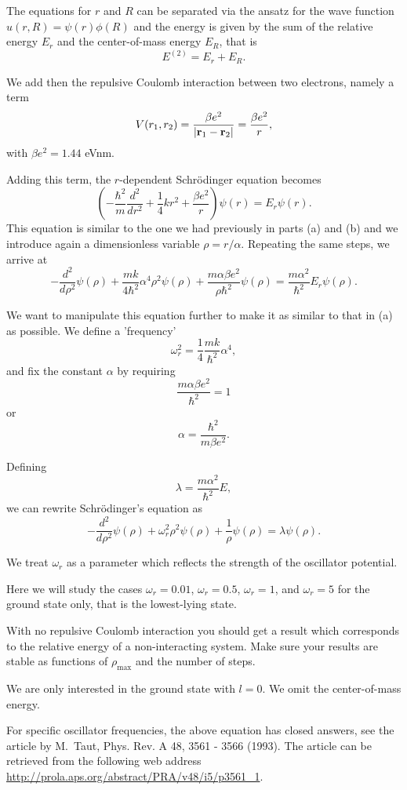 The equations for $r$ and $R$ can be separated via the ansatz for the 
wave function $u(r,R) = \psi(r)\phi(R)$ and the energy is given by the sum
of the relative energy $E_r$ and the center-of-mass energy $E_R$, that
is
\[
E^{(2)}=E_r+E_R.
\]

We add then the repulsive Coulomb interaction between two electrons,
namely a term 
\[
V(r_1,r_2) = \frac{\beta e^2}{|{\bf r}_1-{\bf r}_2|}=\frac{\beta e^2}{r},
\]
with $\beta e^2=1.44$ eVnm.


Adding this term, the $r$-dependent Schr\"odinger equation becomes
\[
\left(  -\frac{\hbar^2}{m} \frac{d^2}{dr^2}+ \frac{1}{4}k r^2+\frac{\beta e^2}{r}\right)\psi(r)  = E_r \psi(r).
\]
This equation is similar to the one we had previously in parts (a) and (b) 
and we introduce
again a dimensionless variable $\rho = r/\alpha$. Repeating the same
steps, we arrive at 
\[
  -\frac{d^2}{d\rho^2} \psi(\rho) 
       + \frac{mk}{4\hbar^2} \alpha^4\rho^2\psi(\rho)+\frac{m\alpha \beta e^2}{\rho\hbar^2}\psi(\rho)  = 
\frac{m\alpha^2}{\hbar^2}E_r \psi(\rho) .
\]



We want to manipulate this equation further to make it as similar to that in (a)
as possible. We define a 'frequency' 
\[
\omega_r^2=\frac{1}{4}\frac{mk}{\hbar^2} \alpha^4,
\]
and fix the constant $\alpha$ by requiring 
\[
\frac{m\alpha \beta e^2}{\hbar^2}=1
\]
or 
\[
\alpha = \frac{\hbar^2}{m\beta e^2}.
\]



Defining 
\[
\lambda = \frac{m\alpha^2}{\hbar^2}E,
\]
we can rewrite Schr\"odinger's equation as
\[
  -\frac{d^2}{d\rho^2} \psi(\rho) + \omega_r^2\rho^2\psi(\rho) +\frac{1}{\rho}\psi(\rho) = \lambda \psi(\rho).
\]



We treat $\omega_r$ as a parameter which reflects the strength of the oscillator potential.

Here we will study the cases $\omega_r = 0.01$, $\omega_r = 0.5$, $\omega_r =1$,
and $\omega_r = 5$   
for the ground state only, that is the lowest-lying state.


With no repulsive Coulomb interaction 
you should get a result which corresponds to 
the relative energy of a non-interacting system.   
Make sure your results are 
stable as functions of $\rho_{\mathrm{max}}$ and the number of steps.

We are only interested in the ground state with $l=0$. We omit the 
center-of-mass energy.

For specific oscillator frequencies, the above equation has closed answers,
see the article by M.~Taut, Phys. Rev. A 48, 3561 - 3566 (1993).
The article can be retrieved from the following web address
\url{http://prola.aps.org/abstract/PRA/v48/i5/p3561_1}.


